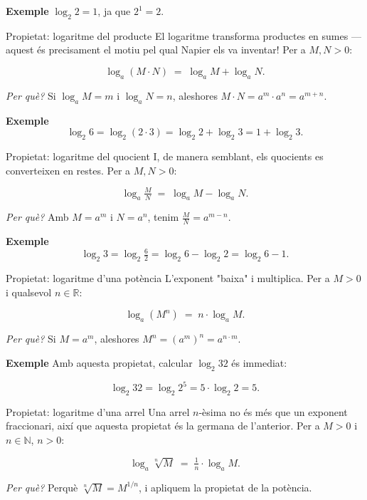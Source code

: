 \begin{exemple}{\textbf{Exemple}}
$\log_2 2=1$, ja que $2^{1}=2$.
\end{exemple}

\begin{propietat}{Propietat: logaritme del producte}
El logaritme transforma productes en sumes — aquest és precisament el motiu pel qual Napier els va inventar! Per a $M,N>0$:

\[
\log_a (M \cdot N) \;=\; \log_a M + \log_a N.
\]

\emph{Per què?} Si $\log_a M=m$ i $\log_a N=n$, aleshores $M \cdot N = a^m \cdot a^n = a^{m+n}$.
\end{propietat}

\begin{exemple}{\textbf{Exemple}}
\[
\log_2 6
= \log_2 (2 \cdot 3)
= \log_2 2 + \log_2 3
= 1 + \log_2 3.
\]
\end{exemple}

\begin{propietat}{Propietat: logaritme del quocient}
I, de manera semblant, els quocients es converteixen en restes. Per a $M,N>0$:

\[
\log_a \tfrac{M}{N} \;=\; \log_a M - \log_a N.
\]

\emph{Per què?} Amb $M=a^m$ i $N=a^n$, tenim $\tfrac{M}{N}=a^{m-n}$.
\end{propietat}

\begin{exemple}{\textbf{Exemple}}
\[
\log_2 3
= \log_2 \tfrac{6}{2}
= \log_2 6 - \log_2 2
= \log_2 6 - 1.
\]
\end{exemple}

\begin{propietat}{Propietat: logaritme d'una potència}
L'exponent "baixa" i multiplica. Per a $M>0$ i qualsevol $n\in\mathbb{R}$:

\[
\log_a (M^n) \;=\; n \cdot \log_a M.
\]

\emph{Per què?} Si $M=a^m$, aleshores $M^n=(a^m)^n=a^{n\cdot m}$.
\end{propietat}

\begin{exemple}{\textbf{Exemple}}
Amb aquesta propietat, calcular $\log_2 32$ és immediat:

\[
\log_2 32 = \log_2 2^5 = 5 \cdot \log_2 2 = 5.
\]
\end{exemple}

\begin{propietat}{Propietat: logaritme d'una arrel}
Una arrel $n$-èsima no és més que un exponent fraccionari, així que aquesta propietat és la germana de l'anterior. Per a $M>0$ i $n\in\mathbb{N}$, $n>0$:

\[
\log_a \sqrt[n]{M} \;=\; \tfrac{1}{n} \cdot \log_a M.
\]

\emph{Per què?} Perquè $\sqrt[n]{M}=M^{1/n}$, i apliquem la propietat de la potència.
\end{propietat}

